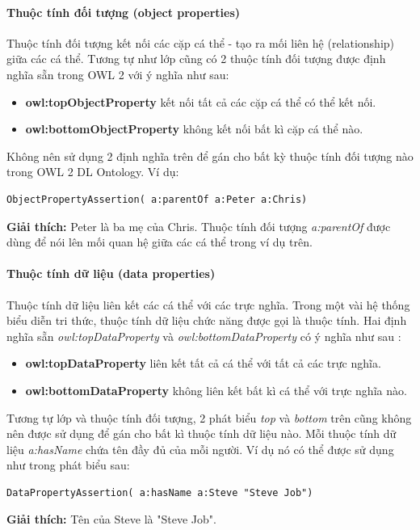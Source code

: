 \paragraph{Thuộc tính đối tượng (object properties)} 
Thuộc tính đối tượng kết nối các cặp cá thể - tạo ra mối liên hệ (relationship) giữa các cá thể. Tương tự như lớp cũng có 2 thuộc tính đối tượng được định nghĩa sẵn trong OWL 2 với ý nghĩa như sau:
\begin{itemize}
	\item \textbf{owl:topObjectProperty} kết nối tất cả các cặp cá thể có thể kết nối.
	\item \textbf{owl:bottomObjectProperty} không kết nối bất kì cặp cá thể nào. 
\end{itemize}
Không nên sử dụng 2 định nghĩa trên để gán cho bất kỳ thuộc tính đối tượng nào trong OWL 2 DL Ontology. Ví dụ:
\begin{verbatim}
ObjectPropertyAssertion( a:parentOf a:Peter a:Chris)  
\end{verbatim}
\textbf{Giải thích:} Peter là ba mẹ của Chris. Thuộc tính đối tượng \textit{a:parentOf} được dùng để nói lên mối quan hệ giữa các cá thể trong ví dụ trên.

\paragraph{Thuộc tính dữ liệu (data properties)}
Thuộc tính dữ liệu liên kết các cá thể với các trực nghĩa. Trong một vài hệ thống biểu diễn tri thức, thuộc tính dữ liệu chức năng được gọi là thuộc tính.
Hai định nghĩa sẵn \textit{owl:topDataProperty} và \textit{owl:bottomDataProperty} có ý nghĩa như sau :
\begin{itemize}
	\item \textbf{owl:topDataProperty} liên kết tất cả cá thể với tất cả các trực nghĩa.
	\item \textbf{owl:bottomDataProperty} không liên kết bất kì cá thể với trực nghĩa nào.
\end{itemize}
Tương tự lớp và thuộc tính đối tượng, 2 phát biểu \textit{top} và \textit{bottom} trên cũng không nên được sử dụng để gán cho bất kì thuộc tính dữ liệu nào. Mỗi thuộc tính dữ liệu \textit{a:hasName} chứa tên đầy đủ của mỗi người. Ví dụ nó có thể được sử dụng như trong phát biểu sau:
\begin{verbatim}
DataPropertyAssertion( a:hasName a:Steve "Steve Job") 
\end{verbatim}
\textbf{Giải thích:} Tên của Steve là "Steve Job".

